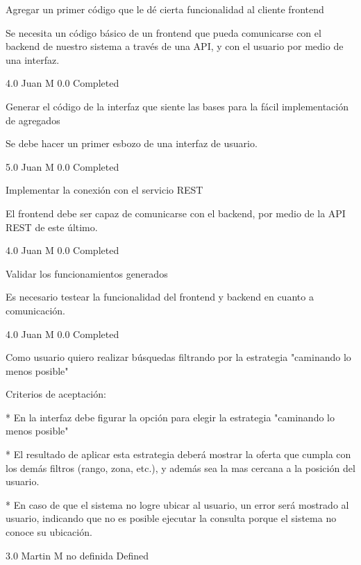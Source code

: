 		{Agregar un primer código que le dé cierta funcionalidad al cliente frontend} %
		{Se necesita un código básico de un frontend que pueda comunicarse con el
backend de nuestro sistema a través de una API, y con el usuario por medio de
una interfaz.

} %
		{4.0} %
		{Juan M} %
		{0.0} %
		{Completed} %

		{Generar el código de la interfaz que siente las bases para la fácil implementación de agregados} %
		{Se debe hacer un primer esbozo de una interfaz de usuario.

} %
		{5.0} %
		{Juan M} %
		{0.0} %
		{Completed} %

		{Implementar la conexión con el servicio REST} %
		{El frontend debe ser capaz de comunicarse con el backend, por medio de la API
REST de este último.

} %
		{4.0} %
		{Juan M} %
		{0.0} %
		{Completed} %

		{Validar los funcionamientos generados} %
		{Es necesario testear la funcionalidad del frontend y backend en cuanto a
comunicación.

} %
		{4.0} %
		{Juan M} %
		{0.0} %
		{Completed} %


\vspace{20pt}

	{Como usuario quiero realizar búsquedas filtrando por la estrategia "caminando lo menos posible"} %
	{Criterios de aceptación:

  

* En la interfaz debe figurar la opción para elegir la estrategia "caminando lo menos posible"

* El resultado de aplicar esta estrategia deberá mostrar la oferta que cumpla con los demás filtros (rango, zona, etc.), y además sea la mas cercana a la posición del usuario.

* En caso de que el sistema no logre ubicar al usuario, un error será mostrado al usuario, indicando que no es posible ejecutar la consulta porque el sistema no conoce su ubicación.

} %
	{} %
	{3.0} %
	{Martin M} %
	{no definida} %
	{Defined} %


